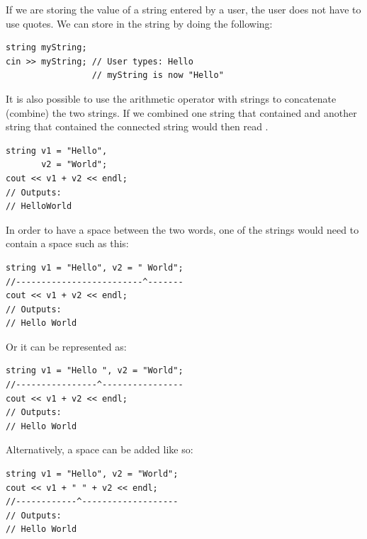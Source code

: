 If we are storing the value of a string entered by a user, the user does not have to use quotes.
We can store  in the string by doing the following:

\noindent\begin{minipage}{\linewidth}\begin{lstlisting}
string myString;
cin >> myString; // User types: Hello
                 // myString is now "Hello"
\end{lstlisting}\end{minipage}

\noindent It is also possible to use the arithmetic operator \Code{+} with strings to concatenate (combine) the two strings.
If we combined one string that contained  and another string that contained  the connected string would then read .

\noindent\begin{minipage}{\linewidth}\begin{lstlisting}
string v1 = "Hello",
       v2 = "World";
cout << v1 + v2 << endl;
// Outputs:
// HelloWorld
\end{lstlisting}\end{minipage}



In order to have a space between the two words, one of the strings would need to contain a space such as this:

\noindent\begin{minipage}{\linewidth}\begin{lstlisting}
string v1 = "Hello", v2 = " World";
//-------------------------^-------
cout << v1 + v2 << endl;
// Outputs:
// Hello World
\end{lstlisting}\end{minipage}

\noindent Or it can be represented as: 

\noindent\begin{minipage}{\linewidth}\begin{lstlisting}
string v1 = "Hello ", v2 = "World";
//----------------^----------------
cout << v1 + v2 << endl;
// Outputs:
// Hello World
\end{lstlisting}\end{minipage}

\noindent Alternatively, a space can be added like so:

\noindent\begin{minipage}{\linewidth}\begin{lstlisting}
string v1 = "Hello", v2 = "World";
cout << v1 + " " + v2 << endl;
//------------^-------------------
// Outputs:
// Hello World
\end{lstlisting}\end{minipage}

